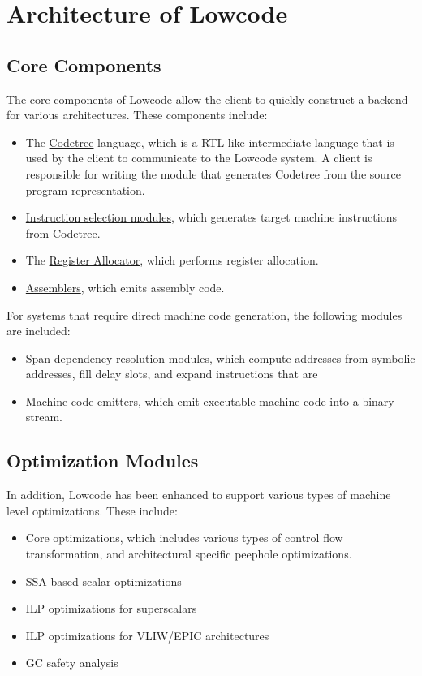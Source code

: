 \section{Architecture of Lowcode}

\subsection{Core Components}

  The core components of Lowcode allow the client to quickly construct 
a backend for various architectures.  These components include:
\begin{itemize}
  \item The \href{codetree.html}{Codetree} language, 
       which is a RTL-like intermediate language
       that is used by the client
       to communicate to the Lowcode system.  A client is
       responsible for writing the module that generates Codetree from
       the source program representation.
  \item \href{instrsel.html}{Instruction selection modules}, 
      which generates target machine 
       instructions from Codetree.
  \item The \href{ra.html}{Register Allocator},
       which performs register allocation.
  \item \href{asm.html}{Assemblers}, which emits assembly code.
\end{itemize}

For systems that require direct machine code generation, the following
modules are included:
\begin{itemize}
  \item \href{span-dep.html}{Span dependency resolution} 
       modules, which compute addresses    
       from symbolic addresses,
       fill delay slots, and expand instructions that are 
  \item \href{mc.html}{Machine code emitters}, 
        which emit executable machine code into a binary stream.
\end{itemize}

\subsection{Optimization Modules}

In addition, Lowcode has been enhanced to support various types of
machine level optimizations.  These include:

\begin{itemize}
  \item Core optimizations, which includes
       various types of control flow transformation, 
       and architectural specific peephole optimizations. 
  \item SSA based scalar optimizations
  \item ILP optimizations for superscalars
  \item ILP optimizations for VLIW/EPIC architectures
  \item GC safety analysis
\end{itemize}

